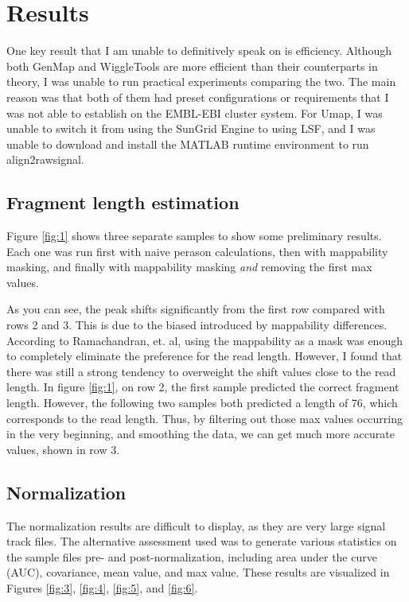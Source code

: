 \documentclass[a4paper]{article}
\begin{document}
  \section{Results}
  One key result that I am unable to definitively speak on is efficiency. Although both GenMap and WiggleTools are more
  efficient than their counterparts in theory, I was unable to run practical experiments comparing the two. The main
  reason was that both of them had preset configurations or requirements that I was not able to establish on the
  EMBL-EBI cluster system. For Umap, I was unable to switch it from using the SunGrid Engine to using LSF, and I
  was unable to download and install the MATLAB runtime environment to run align2rawsignal.

    \subsection{Fragment length estimation}
    Figure \ref{fig:1} shows three separate samples to show some preliminary results. Each one was run first with naive perason calculations,
    then with mappability masking, and finally with mappability masking \textit{and} removing the first max values.

    As you can see, the peak shifts significantly from the first row compared with rows 2 and 3. This is due to the
    biased introduced by mappability differences.
    According to Ramachandran, et. al, using the mappability as a mask was enough to completely eliminate the preference
    for the read length. However, I found that there was still a strong tendency to overweight the shift values close to
    the read length. In figure \ref{fig:1}, on row 2, the first sample predicted the correct fragment length. However,
    the following two samples both predicted a length of 76, which corresponds to the read length. Thus, by filtering out
    those max values occurring in the very beginning, and smoothing the data, we can get much more accurate values,
    shown in row 3.

    \subsection{Normalization}

    The normalization results are difficult to display, as they are very large signal track files. The alternative
    assessment used was to generate various statistics on the sample files pre- and post-normalization, including
    area under the curve (AUC), covariance, mean value, and max value. These results are visualized in Figures \ref{fig:3},
    \ref{fig:4}, \ref{fig:5}, and \ref{fig:6}.
\end{document}
